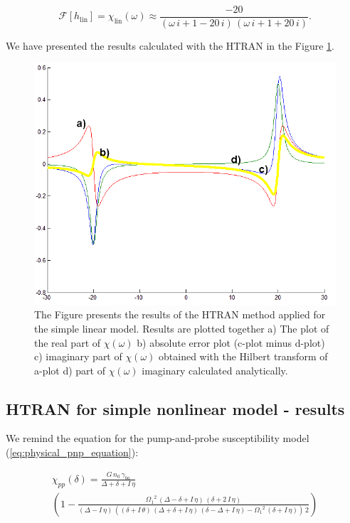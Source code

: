\documentclass[12pt,twoside,a4paper]{article}
\numberwithin{equation}{subsection}
\numberwithin{figure}{subsection}
\begin{document}
\begin{equation} \label{eq:htran_remind_linmod}
  \mathcal{F}[h_{\text{lin}}] = \chi_{\text{lin}}(\omega) \approx \frac{ -20}{(\omega \,i + 1 -20\,i)\,(\omega \,i + 1 + 20\,i)} .
\end{equation}

We have presented the results calculated with the HTRAN in the Figure \ref{eq:htran_lin}.

\begin{figure} 
  \includegraphics[width=150mm]{img/htran_lin.png}
  \caption{The Figure presents the results of the HTRAN method applied for the simple linear model. Results are plotted together 
   a) The plot of the real part of $\chi (\omega )$ 
   b) absolute error plot (c-plot minus d-plot) 
   c) imaginary part of $\chi (\omega )$ obtained with the Hilbert transform of a-plot 
   d) part of $\chi (\omega )$ imaginary calculated analytically. \label{eq:htran_lin}
  }
\end{figure}

\subsection{HTRAN for simple nonlinear model - results} \label{chap:htran_nlo}

We remind the equation for the pump-and-probe susceptibility model (\ref{eq:physical_pnp_equation}): 

\begin{multline} \label{eq:htran_fparameters}
  \chi_{pp} (\delta ) = \frac {G\,{n_{0}}\,{\gamma_{ba}}}{\Delta + \delta + I\,\eta } \\
    \left(  
    	1 - \frac{{\Omega_{1}}^{2}\,(\Delta - \delta  + I\,\eta )\,(\delta  + 2\,I\,\eta )}
    	         {(\Delta  - I\,\eta )\,((\delta + I\,\theta )\,(\Delta + \delta  + I\,\eta )\,(\delta - \Delta  + I\,\eta ) 
    	            - {\Omega_{1}}^{2}\,(\delta  + I\,\eta ))\,2} 
    \right) 
\end{multline}
\end{document}
